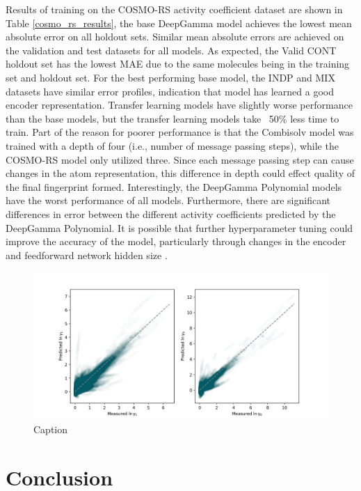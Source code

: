 Results of training on the COSMO-RS activity coefficient dataset are shown in Table \ref{cosmo_rs_results}, the base DeepGamma model achieves the lowest mean absolute error on all holdout sets. Similar mean absolute errors are achieved on the validation and test datasets for all models. As expected, the Valid CONT holdout set has the lowest MAE due to the same molecules being in the training set and holdout set.  For the best performing base model, the INDP and MIX datasets have similar error profiles, indication that model has learned a good encoder representation.  Transfer learning models have slightly worse performance than the base models, but the transfer learning models take ~50\% less time to train. Part of the reason for poorer performance is that the Combisolv model was trained with a depth of four (i.e., number of message passing steps), while the COSMO-RS model only utilized three. Since each message passing step can cause changes in the atom representation, this difference in depth could effect quality of the final fingerprint formed. Interestingly, the DeepGamma Polynomial models have the worst performance of all models. Furthermore, there are significant differences in error between the different activity coefficients predicted by the DeepGamma Polynomial.  It is possible that further hyperparameter tuning could improve the accuracy of the model, particularly through changes in the encoder and feedforward network hidden size \cite{Yang2019, Vermeire2021}.

\begin{figure}[t]
    \centering
    \includegraphics[width=\textwidth]{gfx/Chapter07/cosmo_base_test_indp_parity_plot.png}
    \caption{Caption}
    \label{fig:my_label}
\end{figure}


\section{Conclusion}

